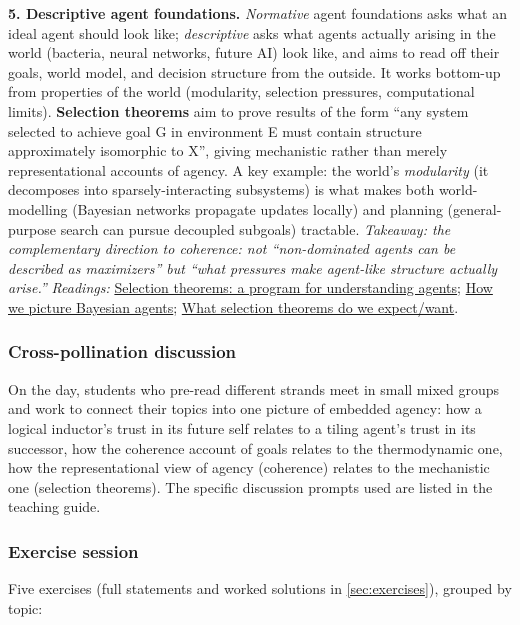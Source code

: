 \documentclass[11pt]{article}
\begin{document}
\textbf{5. Descriptive agent foundations.} \emph{Normative} agent foundations asks what an ideal agent should look like; \emph{descriptive} asks what agents actually arising in the world (bacteria, neural networks, future AI) look like, and aims to read off their goals, world model, and decision structure from the outside. It works bottom-up from properties of the world (modularity, selection pressures, computational limits). \textbf{Selection theorems} aim to prove results of the form ``any system selected to achieve goal G in environment E must contain structure approximately isomorphic to X'', giving mechanistic rather than merely representational accounts of agency. A key example: the world's \emph{modularity} (it decomposes into sparsely-interacting subsystems) is what makes both world-modelling (Bayesian networks propagate updates locally) and planning (general-purpose search can pursue decoupled subgoals) tractable. \emph{Takeaway: the complementary direction to coherence: not ``non-dominated agents can be described as maximizers'' but ``what pressures make agent-like structure actually arise.''} \emph{Readings:} \href{https://www.lesswrong.com/posts/G2Lne2Fi7Qra5Lbuf/selection-theorems-a-program-for-understanding-agents}{Selection theorems: a program for understanding agents}; \href{https://www.lesswrong.com/posts/TiBsZ9beNqDHEvXt4/how-we-picture-bayesian-agents}{How we picture Bayesian agents}; \href{https://www.lesswrong.com/posts/RuDD3aQWLDSb4eTXP/what-selection-theorems-do-we-expect-want}{What selection theorems do we expect/want}.

\subsubsection{Cross-pollination discussion}
On the day, students who pre-read different strands meet in small mixed groups and work to connect their topics into one picture of embedded agency: how a logical inductor's trust in its future self relates to a tiling agent's trust in its successor, how the coherence account of goals relates to the thermodynamic one, how the representational view of agency (coherence) relates to the mechanistic one (selection theorems). The specific discussion prompts used are listed in the teaching guide.

\subsubsection{Exercise session}
Five exercises (full statements and worked solutions in \cref{sec:exercises}), grouped by topic:
\end{document}
